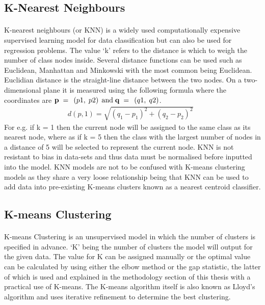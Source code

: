 \subsection{K-Nearest Neighbours}
\label{KNN}
\paragraph{}K-nearest neighbours (or KNN) is a widely used computationally expensive supervised learning model for data classification but can also be used for regression problems. The value ‘k’ refers to the distance is which to weigh the number of class nodes inside. Several distance functions can be used such as Euclidean, Manhattan and Minkowski with the most common being Euclidean. Euclidian distance is the straight-line distance between the two nodes. On a two-dimensional plane it is measured using the following formula where the coordinates are 
${\bf{p}}{\rm{\;}} = {\rm{\;}}\left( {p1,{\rm{\;}}p2} \right){\rm{\;and\;}}{\bf{q}}{\rm{\;}} = {\rm{\;}}\left( {q1,{\rm{\;}}q2} \right)$.
\begin{align*}
d\left( {p,1} \right) = \sqrt {{{\left( {{q_1} - {p_1}} \right)}^2} + {{\left( {{q_2} - {p_2}} \right)}^2}} \;\;
\end{align*}
For e.g. if k = 1 then the current node will be assigned to the same class as its nearest node, where as if k = 5 then the class with the largest number of nodes in a distance of 5 will be selected to represent the current node. KNN is not resistant to bias in data-sets and thus data must be normalised before inputted into the model. KNN models are not to be confused with K-means clustering models as they share a very loose relationship being that KNN can be used to add data into pre-existing K-means clusters known as a nearest centroid classifier.
\subsection{K-means Clustering} 
\paragraph{}K-means Clustering is an unsupervised model in which the number of clusters is specified in advance. ‘K’ being the number of clusters the model will output for the given data. The value for K can be assigned manually or the optimal value can be calculated by using either the elbow method or the gap statistic, the latter of which is used and explained in the methodology section of this thesis with a practical use of K-means. The K-means algorithm itself is also known as Lloyd's algorithm and uses iterative refinement to determine the best clustering.
